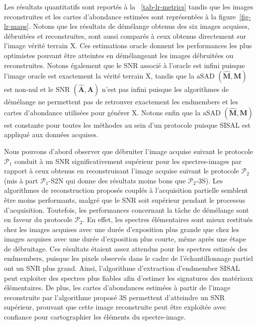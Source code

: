 \begin{mylandscape}
    \begin{normalfigure}
        \centering
        
        \caption{Ligne 1 : composition colorée des spectres-images oracle, acquis (Full\textsubscript{2ms}), débruités (protocole $\mathcal{P}_1$) et reconstruits (protocole $\mathcal{P}_2$). Lignes 2-5 : les cartes d'abondance estimées par SUNSAL pour les spectre-images correspondants.%
            \protect\label{fig-lr-maps}}
    \end{normalfigure}
\end{mylandscape}

Les résultats quantitatifs sont reportés à la \tabname~\ref{tab-lr-metrics} tandis que les images reconstruites et les cartes d'abondance estimées sont représentées à la figure~\ref{fig-lr-maps}. Notons que les résultats de démélange obtenus des six images acquises, débruitées et reconstruites, sont aussi comparés à ceux obtenus directement sur l'image vérité terrain \gls{X}. Ces estimations oracle donnent les performances les plus optimistes pouvant être atteintes en démélangeant les images débruitées ou reconstruites. Notons également que le SNR associé à l'oracle est infini puisque l'image oracle est exactement la vérité terrain \gls{X}, tandis que la $\mathrm{aSAD}$ $(\hat{\mathbf{M}}, \mathbf{M})$ est non-nul et le $\mathrm{SNR}$ $(\hat{\mathbf{A}}, \mathbf{A})$ n'est pas infini puisque les algorithmes de démélange ne permettent pas de retrouver exactement les endmembers et les cartes d'abondance utilisées pour générer \gls{X}. Notons enfin que la $\mathrm{aSAD}$ $(\hat{\mathbf{M}}, \mathbf{M})$ est constante pour toutes les méthodes au sein d'un protocole puisque SISAL est appliqué aux données acquises.

Nous pouvons d'abord observer que débruiter l'image acquise suivant le protocole $\mathcal{P}_1$ conduit à un SNR significativement supérieur pour les spectres-images par rapport à ceux obtenus en reconstruisant l'image acquise suivant le protocole $\mathcal{P}_2$ (mis à part $\mathcal{P}_1$-S2N qui donne des résultats moins bons que $\mathcal{P}_2$-3S). Les algorithmes de reconstruction proposés couplés à l'acquisition partielle semblent être moins performants, malgré que le SNR soit supérieur pendant le processus d'acquisition. Toutefois, les performances concernant la tâche de démélange sont en faveur du protocole $\mathcal{P}_2$. En effet, les spectres élémentaires sont mieux restitués chez les images acquises avec une durée d'exposition plus grande que chez les images acquises avec une durée d'exposition plus courte, même après une étape de débruitage. Ces résultats étaient assez attendus pour les spectres estimés des endmembers, puisque les pixels observés dans le cadre de l'échantillonnage partiel ont un SNR plus grand. Ainsi, l'algorithme d'extraction d'endmember SISAL peut exploiter des spectres plus fiables afin d'estimer les signatures des matériaux élémentaires. De plus, les cartes d'abondances estimées à partir de l'image reconstruite par l'algorithme proposé 3S permettent d'atteindre un SNR supérieur, prouvant que cette image reconstruite peut être exploitée avec confiance pour cartographier les éléments du spectre-image.

